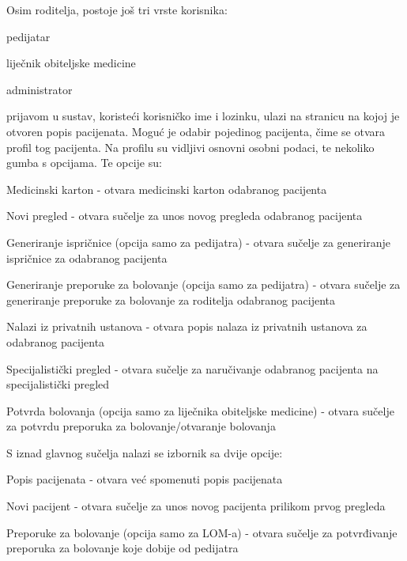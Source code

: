 		\noindent Osim roditelja, postoje još tri vrste korisnika:
		
		\begin{packed_item}
			
			\item  pedijatar
			\item  liječnik obiteljske medicine
			\item  administrator
			
		\end{packed_item}	
		
		 prijavom u sustav, koristeći korisničko ime i lozinku, ulazi na stranicu na kojoj je otvoren popis pacijenata. Moguć je odabir pojedinog pacijenta, čime se otvara profil tog pacijenta. Na profilu su vidljivi osnovni osobni podaci, te nekoliko gumba s opcijama. Te opcije su:
		
		\begin{packed_item}
			
			\item  Medicinski karton - otvara medicinski karton odabranog pacijenta
			\item  Novi pregled - otvara sučelje za unos novog pregleda odabranog pacijenta
			\item  Generiranje ispričnice (opcija samo za pedijatra) - otvara sučelje za generiranje ispričnice za odabranog pacijenta
			\item  Generiranje preporuke za bolovanje  (opcija samo za pedijatra) - otvara sučelje za generiranje preporuke za bolovanje za roditelja odabranog pacijenta
			\item  Nalazi iz privatnih ustanova - otvara popis nalaza iz privatnih ustanova za odabranog pacijenta
			\item  Specijalistički pregled - otvara sučelje za naručivanje odabranog pacijenta na specijalistički pregled
			\item  Potvrda bolovanja (opcija samo za liječnika obiteljske medicine) - otvara sučelje za potvrdu preporuka za bolovanje/otvaranje bolovanja
			
		\end{packed_item}
		
		S iznad glavnog sučelja nalazi se izbornik sa dvije opcije:
		
		\begin{packed_item}
			
			\item  Popis pacijenata - otvara već spomenuti popis pacijenata
			\item  Novi pacijent - otvara sučelje za unos novog pacijenta prilikom prvog pregleda
			\item  Preporuke za bolovanje (opcija samo za LOM-a) - otvara sučelje za potvrđivanje preporuka za bolovanje koje dobije od pedijatra
			
		\end{packed_item}	
		
